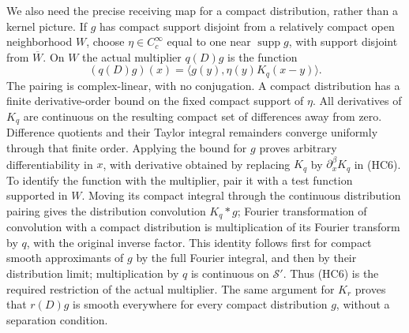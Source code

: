 \documentclass[
  11pt,
]{article}
\begin{document}
We also need the precise receiving map for a compact distribution,
rather than a kernel picture. If \(g\) has compact support disjoint from
a relatively compact open neighborhood \(W\), choose
\(\eta\in C_c^\infty\) equal to one near \(\operatorname{supp}g\), with
support disjoint from \(\overline W\). On \(W\) the actual multiplier
\(q(D)g\) is the function \[
(q(D)g)(x)=\langle g(y),\eta(y)K_q(x-y)\rangle.
\tag{HC6}
\] The pairing is complex-linear, with no conjugation. A compact
distribution has a finite derivative-order bound on the fixed compact
support of \(\eta\). All derivatives of \(K_q\) are continuous on the
resulting compact set of differences away from zero. Difference
quotients and their Taylor integral remainders converge uniformly
through that finite order. Applying the bound for \(g\) proves arbitrary
differentiability in \(x\), with derivative obtained by replacing
\(K_q\) by \(\partial_x^\beta K_q\) in (HC6). To identify the function
with the multiplier, pair it with a test function supported in \(W\).
Moving its compact integral through the continuous distribution pairing
gives the distribution convolution \(K_q*g\); Fourier transformation of
convolution with a compact distribution is multiplication of its Fourier
transform by \(q\), with the original inverse factor. This identity
follows first for compact smooth approximants of \(g\) by the full
Fourier integral, and then by their distribution limit; multiplication
by \(q\) is continuous on \(\mathcal S'\). Thus (HC6) is the required
restriction of the actual multiplier. The same argument for \(K_r\)
proves that \(r(D)g\) is smooth everywhere for every compact
distribution \(g\), without a separation condition.
\end{document}
